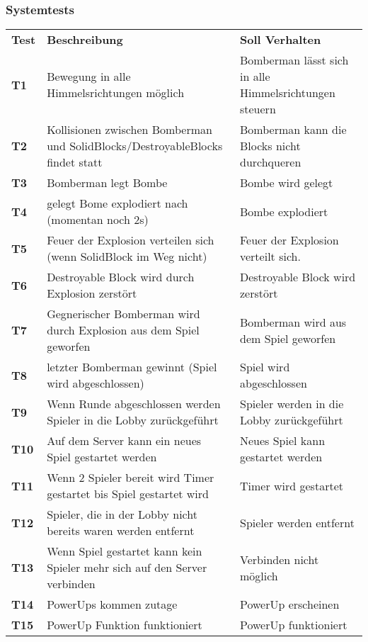 \documentclass[11pt]{scrartcl}
\begin{document}
\subsubsection{Systemtests}
\begin{tabularx}{\linewidth}{l X X}
  \bf{Test} & \bf{Beschreibung} & \bf{Soll Verhalten} \\
  \bf{T1} & Bewegung in alle Himmelsrichtungen möglich & 
  Bomberman lässt sich in alle Himmelsrichtungen steuern\\
  \bf{T2} & Kollisionen zwischen Bomberman und SolidBlocks/DestroyableBlocks 
  findet statt & Bomberman kann die Blocks nicht durchqueren \\
  \bf{T3} & Bomberman legt Bombe & Bombe wird gelegt \\
  \bf{T4} & gelegt Bome explodiert nach (momentan noch 2s) & Bombe explodiert \\
  \bf{T5} & Feuer der Explosion verteilen sich (wenn SolidBlock im Weg nicht) & Feuer der 
  Explosion verteilt sich.\\
  \bf{T6} & Destroyable Block wird durch Explosion zerstört & Destroyable Block wird 
  zerstört \\
  \bf{T7} & Gegnerischer Bomberman wird durch Explosion aus dem Spiel geworfen & 
  Bomberman wird aus dem Spiel geworfen\\
  \bf{T8} & letzter Bomberman gewinnt (Spiel wird abgeschlossen) & Spiel wird 
  abgeschlossen \\
  \bf{T9} & Wenn Runde abgeschlossen werden Spieler in die Lobby zurückgeführt & 
  Spieler werden in die Lobby zurückgeführt \\
  \bf{T10} & Auf dem Server kann ein neues Spiel gestartet werden & Neues Spiel 
  kann gestartet werden \\
  \bf{T11} & Wenn 2 Spieler bereit wird Timer gestartet bis Spiel gestartet 
  wird & Timer wird gestartet \\
  \bf{T12} & Spieler, die in der Lobby nicht bereits waren werden entfernt & 
  Spieler werden entfernt \\
  \bf{T13} & Wenn Spiel gestartet kann kein Spieler mehr sich auf den Server 
  verbinden & Verbinden nicht möglich \\
  \bf{T14} & PowerUps kommen zutage & PowerUp erscheinen \\
  \bf{T15} & PowerUp Funktion funktioniert & PowerUp funktioniert \\
\end{tabularx}
\end{document}
